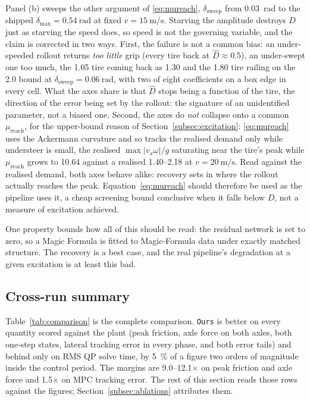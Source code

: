 Panel (b) sweeps the other argument of \eqref{eq:mureach},
$\delta_{\mathrm{sweep}}$ from \SI{0.03}{\radian} to the shipped
$\delta_{\max}=\SI{0.54}{\radian}$ at fixed $v=\SI{15}{\meter\per\second}$.
Starving the amplitude destroys $D$ just as starving the speed does, so speed
is not the governing variable, and the claim is corrected in two ways. First,
the failure is not a common bias: an under-speeded rollout returns \emph{too
little} grip (every tire back at $\hat D\approx0.5$), an under-swept one too
much, the \num{1.05} tire coming back as \num{1.30} and the \num{1.80} tire
railing on the \num{2.0} bound at
$\delta_{\mathrm{sweep}}=\SI{0.06}{\radian}$, with two of eight coefficients on
a box edge in every cell. What the axes share is that $\hat D$ stops being a
function of the tire, the direction of the error being set by the rollout: the
signature of an unidentified parameter, not a biased one. Second, the axes do
\emph{not} collapse onto a common $\mu_{\mathrm{reach}}$, for the upper-bound
reason of Section~\ref{subsec:excitation}: \eqref{eq:mureach} uses the
Ackermann curvature and so tracks the realised demand only while understeer is
small, the realised $\max|v_{x}\omega|/g$ saturating near the tire's peak while
$\mu_{\mathrm{reach}}$ grows to \num{10.64} against a realised
\numrange{1.40}{2.18} at $v=\SI{20}{\meter\per\second}$. Read against the
realised demand, both axes behave alike: recovery sets in where the rollout
actually reaches the peak. Equation~\eqref{eq:mureach} should therefore be used
as the pipeline uses it, a cheap screening bound conclusive when it falls below
$D$, not a measure of excitation achieved.

One property bounds how all of this should be read: the residual network is set
to zero, so a Magic Formula is fitted to Magic-Formula data under exactly
matched structure. The recovery is a best case, and the real pipeline's
degradation at a given excitation is at least this bad.

\subsection{Cross-run summary}
\label{subsec:summary}

Table~\ref{tab:comparison} is the complete comparison. \texttt{Ours} is better
on every quantity scored against the plant (peak friction, axle force on both
axles, both one-step states, lateral tracking error in every phase, and both
error tails) and behind only on RMS QP solve time, by \SI{5}{\percent} of a
figure two orders of magnitude inside the control period. The margins are
\numrange{9.0}{12.1}$\times$ on peak friction and axle force and
\num{1.5}$\times$ on MPC tracking error. The rest of this section reads those
rows against the figures; Section~\ref{subsec:ablations} attributes them.

